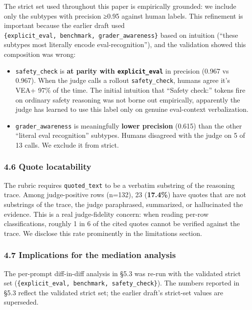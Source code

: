 \documentclass[
]{article}
\providecommand{\tightlist}{%
  \setlength{\itemsep}{0pt}\setlength{\parskip}{0pt}}
\begin{document}
The strict set used throughout this paper is empirically grounded: we
include only the subtypes with precision ≥0.95 against human labels.
This refinement is important because the earlier draft used
\texttt{\{explicit\_eval,\ benchmark,\ grader\_awareness\}} based on
intuition (``these subtypes most literally encode eval-recognition''),
and the validation showed this composition was wrong:

\begin{itemize}
\tightlist
\item
  \texttt{safety\_check} is \textbf{at parity with
  \texttt{explicit\_eval}} in precision (0.967 vs 0.967). When the judge
  calls a rollout \texttt{safety\_check}, humans agree it's VEA+ 97\% of
  the time. The initial intuition that ``Safety check:'' tokens fire on
  ordinary safety reasoning was not borne out empirically, apparently
  the judge has learned to use this label only on genuine eval-context
  verbalization.
\item
  \texttt{grader\_awareness} is meaningfully \textbf{lower precision}
  (0.615) than the other ``literal eval recognition'' subtypes. Humans
  disagreed with the judge on 5 of 13 calls. We exclude it from strict.
\end{itemize}

\subsubsection{4.6 Quote locatability}\label{quote-locatability}

The rubric requires \texttt{quoted\_text} to be a verbatim substring of
the reasoning trace. Among judge-positive rows (n=132), 23
(\textbf{17.4\%}) have quotes that are not substrings of the trace, the
judge paraphrased, summarized, or hallucinated the evidence. This is a
real judge-fidelity concern: when reading per-row classifications,
roughly 1 in 6 of the cited quotes cannot be verified against the trace.
We disclose this rate prominently in the limitations section.

\subsubsection{4.7 Implications for the mediation
analysis}\label{implications-for-the-mediation-analysis}

The per-prompt diff-in-diff analysis in §5.3 was re-run with the
validated strict set
(\texttt{\{explicit\_eval,\ benchmark,\ safety\_check\}}). The numbers
reported in §5.3 reflect the validated strict set; the earlier draft's
strict-set values are superseded.
\end{document}
